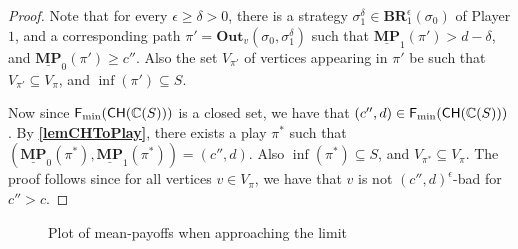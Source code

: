 \begin{proof}
Note that for every $\epsilon \ge \delta > 0$, there is a strategy $\sigma_1^\delta \in \mathbf{BR}_1^{\epsilon}(\sigma_0)$ of Player $1$, and a corresponding path $\pi' = \mathbf{Out}_v(\sigma_0, \sigma_1^\delta)$ such that $\underline{\mathbf{MP}}_1(\pi') > d-\delta$, and $\underline{\mathbf{MP}}_0(\pi') \geqslant c''$.
Also the set $V_{\pi'}$ of vertices appearing in $\pi'$ be such that $V_{\pi'} \subseteq V_\pi$, and $\inf(\pi') \subseteq S$.

Now since ${\sf F_{\min}}{({\sf CH}(\mathbb{C}(S)))}$ is a closed set, we have that $(c'',d) \in {\sf F_{\min}}{({\sf CH}(\mathbb{C}(S)))}$.
By \textbf{\cref{lemCHToPlay}}, there exists a play $\pi^*$ such that $(\underline{\mathbf{MP}}_0(\pi^*), \underline{\mathbf{MP}}_1(\pi^*)) = (c'',d)$.
Also $\inf(\pi^*) \subseteq S$, and $V_{\pi^*} \subseteq V_{\pi}$.
The proof follows since for all vertices $v \in V_\pi$, we have that $v$ is not $(c'',d)^{\epsilon}$-bad for $c'' > c$.
\end{proof}

\begin{figure}
    \centering
    \caption{Plot of mean-payoffs when approaching the limit}
    \label{fig:plot_mp_limit}
\end{figure}

